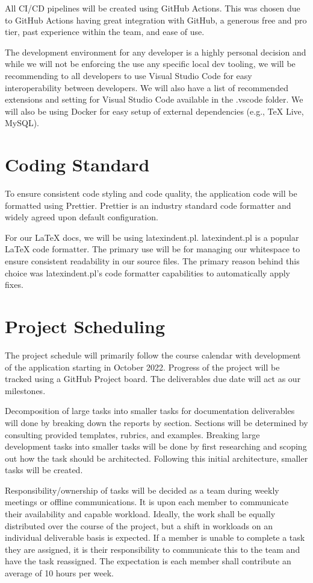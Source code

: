 \documentclass{article}
\begin{document}
All CI/CD pipelines will be created using GitHub Actions. This was chosen due to GitHub Actions
having great integration with GitHub, a generous free and pro tier, past experience within the team,
and ease of use.

The development environment for any developer is a highly personal decision and while we will not be
enforcing the use any specific local dev tooling, we will be recommending to all developers to use
Visual Studio Code for easy interoperability between developers. We will also have a list of
recommended extensions and setting for Visual Studio Code available in the .vscode folder. We will
also be using Docker for easy setup of external dependencies (e.g., TeX Live, MySQL).

\section{Coding Standard}

To ensure consistent code styling and code quality, the application code will be formatted using
Prettier. Prettier is an industry standard code formatter and widely agreed upon default
configuration.

For our \LaTeX{} docs, we will be using latexindent.pl. latexindent.pl is a popular \LaTeX{} code
formatter. The primary use will be for managing our whitespace to ensure consistent readability in
our source files. The primary reason behind this choice was latexindent.pl's code formatter
capabilities to automatically apply fixes.

\section{Project Scheduling}


The project schedule will primarily follow the course calendar with development of the application
starting in October 2022. Progress of the project will be tracked using a GitHub Project board. The
deliverables due date will act as our milestones.

Decomposition of large tasks into smaller tasks for documentation deliverables will done by breaking
down the reports by section. Sections will be determined by consulting provided templates, rubrics,
and examples. Breaking large development tasks into smaller tasks will be done by first researching
and scoping out how the task should be architected. Following this initial architecture, smaller
tasks will be created.

Responsibility/ownership of tasks will be decided as a team during weekly meetings or offline
communications. It is upon each member to communicate their availability and capable workload.
Ideally, the work shall be equally distributed over the course of the project, but a shift in
workloads on an individual deliverable basis is expected. If a member is unable to complete a task
they are assigned, it is their responsibility to communicate this to the team and have the task
reassigned. The expectation is each member shall contribute an average of 10 hours per week.
\end{document}
